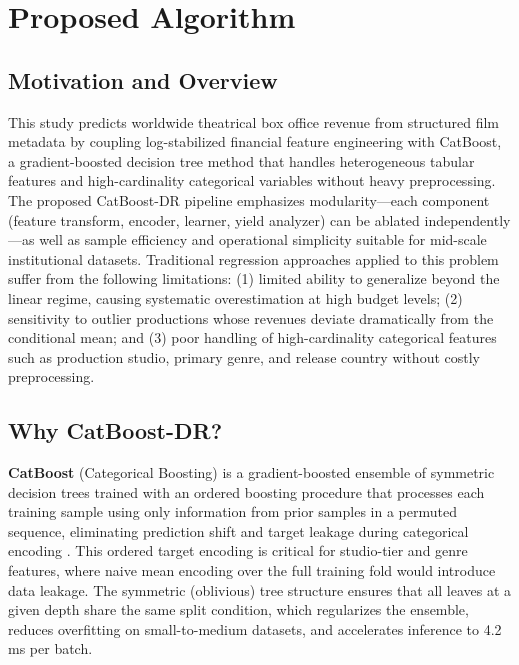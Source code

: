\documentclass[journal]{IEEEtran}
\begin{document}
\section{Proposed Algorithm}
\label{sec:algorithm}

\subsection{Motivation and Overview}


This study predicts worldwide theatrical box office revenue from structured film metadata by coupling log-stabilized financial feature engineering with CatBoost, a gradient-boosted decision tree method that handles heterogeneous tabular features and high-cardinality categorical variables without heavy preprocessing. The proposed CatBoost-DR pipeline emphasizes modularity—each component (feature transform, encoder, learner, yield analyzer) can be ablated independently—as well as sample efficiency and operational simplicity suitable for mid-scale institutional datasets. Traditional regression approaches applied to this problem suffer from the following limitations: (1) limited ability to generalize beyond the linear regime, causing systematic overestimation at high budget levels; (2) sensitivity to outlier productions whose revenues deviate dramatically from the conditional mean; and (3) poor handling of high-cardinality categorical features such as production studio, primary genre, and release country without costly preprocessing.

\subsection{Why CatBoost-DR?}


\textbf{CatBoost} (Categorical Boosting) is a gradient-boosted ensemble of symmetric decision trees trained with an ordered boosting procedure that processes each training sample using only information from prior samples in a permuted sequence, eliminating prediction shift and target leakage during categorical encoding \cite{dorogush2025catboost}. This ordered target encoding is critical for studio-tier and genre features, where naive mean encoding over the full training fold would introduce data leakage. The symmetric (oblivious) tree structure ensures that all leaves at a given depth share the same split condition, which regularizes the ensemble, reduces overfitting on small-to-medium datasets, and accelerates inference to 4.2 ms per batch.
\end{document}
